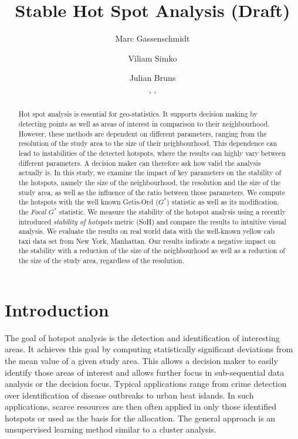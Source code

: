\documentclass{itatnew}
\begin{document}
\title{Stable Hot Spot Analysis (Draft)}

\author{
  Marc Gassenschmidt \and
  Viliam Simko  \and
  Julian Bruns
  \\
  ,
  ,
}

  
\maketitle              %



\begin{abstract}
Hot spot analysis is essential for geo-statistics.
It supports decision making by detecting points
as well as areas of interest in comparison to their
neighbourhood. However, these methods are dependent
on different parameters, ranging from the resolution
of the study area to the size of their neighbourhood.
This dependence can lead to instabilities of the detected
hotspots, where the results can highly vary between
different parameters. A decision maker can therefore ask
how valid the analysis actually is.
%
In this study, we examine the impact of key parameters
on the stability of the hotspots, namely the size of
the neighbourhood, the resolution and the size of the
study area, as well as the influence of the ratio between
those parameters.
%
We compute the hotspots with the well known Getis-Ord ($G^*$)
statistic as well as its modification, the \emph{Focal $G^*$} statistic.
We measure the stability of the hotspot analysis using
a recently introduced \emph{stability of hotspots} metric (SoH)
and compare the results to intuitive visual analysis.
%
We evaluate the results on real world data with the well-known
yellow cab taxi data set from New York, Manhattan.
Our results indicate a negative impact on the stability with
a reduction of the size of the neighbourhood as well as
a reduction of the size of the study area, regardless of
the resolution.
\end{abstract}


\section{Introduction}
The goal of hotspot analysis is the detection and identification of interesting areas. It achieves this goal by computing statistically significant deviations from the mean value of a given study area. This allows a decision maker to easily identify those areas of interest and allows further focus in sub-sequential data analysis or the decision focus. Typical applications range from crime detection over identification of disease outbreaks to urban heat islands. In such applications, scarce resources are then often applied in only those identified hotspots or used as the basis for the allocation. The general approach is an unsupervised learning method similar to a cluster analysis. 
\end{document}
